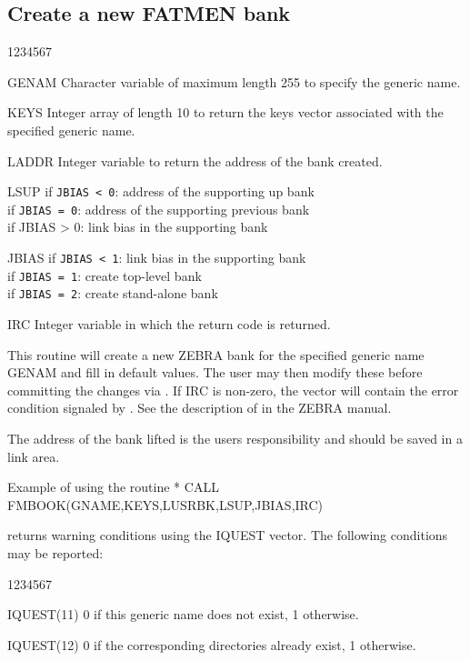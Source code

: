 \subsection{Create a new FATMEN bank}
\begin{DLtt}{1234567}
\item[GENAM]
Character variable of maximum length 255 to specify the generic name.
\item[KEYS]
Integer array of length 10 to return the keys vector associated
with the specified generic name.
\item[LADDR]
Integer variable to return the address of the bank created.
\item[LSUP]
if {\tt JBIAS < 0}: address of the supporting up bank \\
if {\tt JBIAS = 0}: address of the supporting previous bank \\
if {JBIAS > 0}: link bias in the supporting bank
\item[JBIAS]
if {\tt JBIAS < 1}: link bias in the supporting bank \\
if {\tt JBIAS = 1}: create top-level bank  \\
if {\tt JBIAS = 2}: create stand-alone bank
\item[IRC]
Integer variable in which the return code is returned.
\end{DLtt}
\par
This routine will create a new ZEBRA bank for the specified
generic name GENAM and fill in default values.
The user may then modify these before
committing the changes via .
If IRC is non-zero, the  vector will contain the error condition
signaled by . 
See the description of  in the ZEBRA manual.

The address of the bank lifted is the
users responsibility and should be saved in a link area.
\begin{XMPt}{Example of using the \protect{} routine}
*
      CALL FMBOOK(GNAME,KEYS,LUSRBK,LSUP,JBIAS,IRC)
\end{XMPt}

 returns warning conditions using the IQUEST vector.
The following conditions may be reported:
\begin{DLtt}{1234567}
\item[IQUEST(11)]
0 if this generic name does not exist, 1 otherwise.
\item[IQUEST(12)]
0 if the corresponding directories already exist, 1 otherwise.
\end{DLtt}

